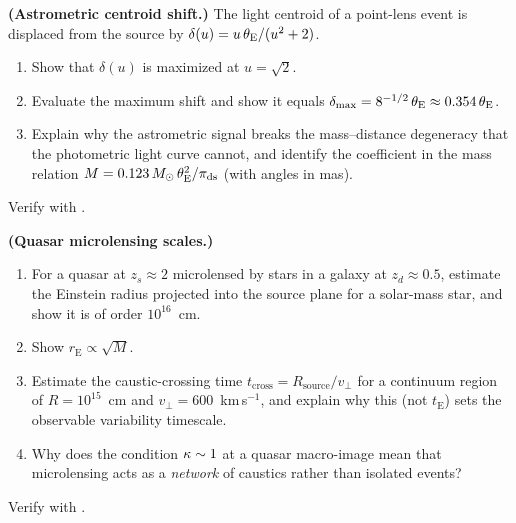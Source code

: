 \begin{exercise}
\label{ex:micro_astrometric}
\textbf{(Astrometric centroid shift.)}
The light centroid of a point-lens event is displaced from the source by
$\delta(u) = u\,\theta_{\mathrm{E}}/(u^2+2)$.
\begin{enumerate}[label=(\alph*)]
    \item Show that $\delta(u)$ is maximized at $u = \sqrt2$.
    \item Evaluate the maximum shift and show it equals
          $\delta_{\max} = 8^{-1/2}\,\theta_{\mathrm{E}} \approx 0.354\,\theta_{\mathrm{E}}$.
    \item Explain why the astrometric signal breaks the mass--distance
          degeneracy that the photometric light curve cannot, and identify
          the coefficient in the mass relation
          $M = 0.123\,M_{\odot}\,\theta_{\mathrm{E}}^2/\pi_{\mathrm{ds}}$ (with angles in mas).
\end{enumerate}
Verify with
.
\end{exercise}

\begin{exercise}
\label{ex:micro_quasar}
\textbf{(Quasar microlensing scales.)}
\begin{enumerate}[label=(\alph*)]
    \item For a quasar at $z_s \approx 2$ microlensed by stars in a galaxy at
          $z_d \approx 0.5$, estimate the Einstein radius projected into the
          source plane for a solar-mass star, and show it is of order
          $10^{16}$~cm.
    \item Show $r_{\mathrm{E}} \propto \sqrt{M}$.
    \item Estimate the caustic-crossing time
          $t_{\mathrm{cross}} = R_{\mathrm{source}}/v_\perp$ for a continuum
          region of $R = 10^{15}$~cm and $v_\perp = 600$~km\,s$^{-1}$, and
          explain why this (not $t_{\mathrm{E}}$) sets the observable
          variability timescale.
    \item Why does the condition $\kappa \sim 1$ at a quasar macro-image mean
          that microlensing acts as a \emph{network} of caustics rather than
          isolated events?
\end{enumerate}
Verify with
.
\end{exercise}
